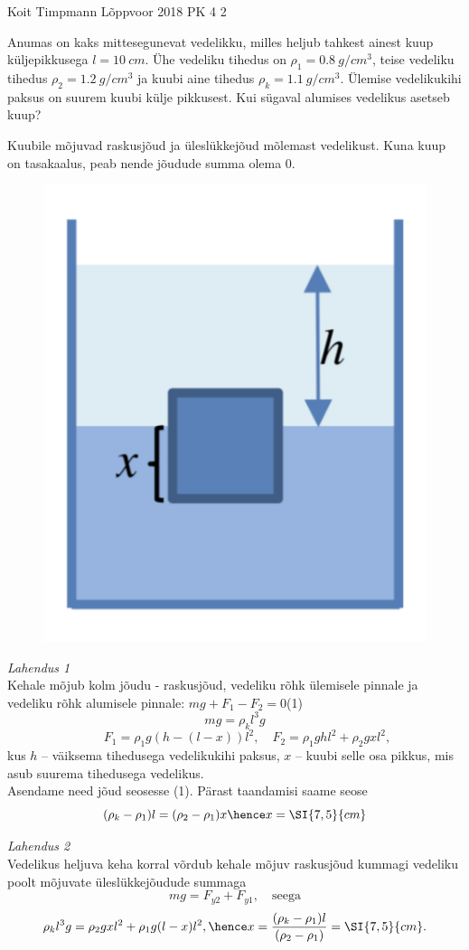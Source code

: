 {Koit Timpmann} %
{Lõppvoor} %
{2018} %
{PK 4} %
{2} %
{
\ifStatement
Anumas on kaks mittesegunevat vedelikku, milles heljub tahkest ainest kuup küljepikkusega $l = \SI{10}{cm}$. Ühe vedeliku tihedus on $\rho_1 = \SI{0,8}{g/cm^3}$, teise vedeliku tihedus $\rho_2 = \SI{1,2}{g/cm^3}$ ja kuubi aine tihedus $\rho_k = \SI{1,1}{g/cm^3}$. Ülemise vedelikukihi paksus on suurem kuubi külje pikkusest. Kui sügaval alumises vedelikus asetseb kuup?
\fi


\ifHint
Kuubile mõjuvad raskusjõud ja üleslükkejõud mõlemast vedelikust. Kuna kuup on tasakaalus, peab nende jõudude summa olema $0$.
\fi


\ifSolution
\begin{figure}%
\vspace{-40 pt}%
\begin{center}
\includegraphics[width=0.7\linewidth]{lahenduskuup}%
\end{center}
\vspace{-10 pt}%
\end{figure}

\emph{Lahendus 1}\\
Kehale mõjub kolm jõudu - raskusjõud, vedeliku rõhk ülemisele pinnale ja vedeliku rõhk alumisele pinnale: $mg + F_1 - F_2 = 0$\quad (1)
\[ mg = \rho_k l^3g\]
\[ \quad\quad F_1 = \rho_1 g(h - (l-x))l^2, \quad F_2 = \rho_1ghl^2 + \rho_2gxl^2, \]
kus $h$ – väiksema tihedusega vedelikukihi paksus, $x$ – kuubi selle osa pikkus, mis asub suurema tihedusega vedelikus.\\ 
Asendame need jõud seosesse (1). Pärast taandamisi saame seose
\[ (\rho_k - \rho_1)l = (\rho_2 - \rho_1)x \hence x = \SI{7,5}{cm} \]


\emph{Lahendus 2}\\
Vedelikus heljuva keha korral võrdub kehale mõjuv raskusjõud kummagi vedeliku poolt mõjuvate üleslükkejõudude summaga
\[ mg = F_{y2} + F_{y1}, \quad\text{seega} \]
\[ \rho_kl^3g = \rho_2gxl^2 + \rho_1g(l-x)l^2, \hence x=\frac{(\rho_k - \rho_1)l}{(\rho_2 - \rho_1)} = \SI{7,5}{cm}. \]
\fi
}
